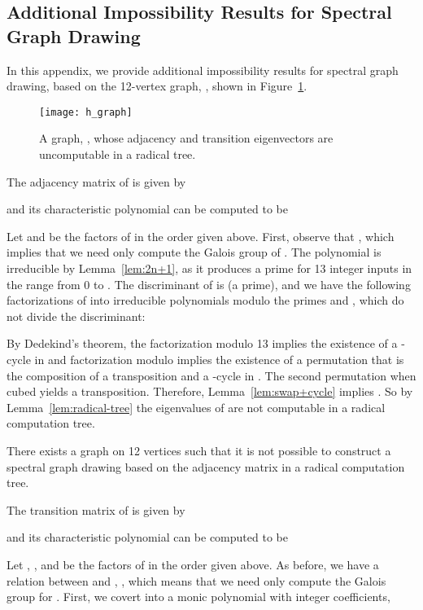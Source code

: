 \documentclass[oribibl,10pt]{llncs}
\begin{document}
\begin{appendix}
\clearpage
\section{Additional Impossibility Results for Spectral Graph Drawing}
\label{app:spectral}
In this appendix, we provide additional impossibility results for spectral
graph drawing, based on the 12-vertex graph, , shown in
Figure~\ref{fig:h-graph}.

\begin{figure}[hbt]
\centering
\texttt{[image: h\_graph]}
\caption{A graph, , whose adjacency and transition eigenvectors are uncomputable in a radical tree.}
\label{fig:h-graph}
\end{figure}

The adjacency matrix of  is given by

and its characteristic polynomial can be computed to be

Let  and  be the factors of  in the order given above. First, observe that , which implies that we need only compute the Galois group of . The polynomial  is irreducible by Lemma~\ref{lem:2n+1}, as it produces a prime for 13 integer inputs in the range from 0 to . The discriminant of  is  (a prime), and we have the following factorizations of  into irreducible polynomials modulo the primes  and , which do not divide the discriminant:

By Dedekind's theorem, the factorization modulo 13 implies the existence of a -cycle in  and factorization modulo  implies the existence of a permutation that is the composition of a transposition and a -cycle in . The second permutation when cubed yields a transposition. Therefore, Lemma~\ref{lem:swap+cycle} implies . So by Lemma~\ref{lem:radical-tree} the eigenvalues of  are not computable in a radical computation tree.

\begin{theorem}
There exists a graph on 12 vertices such that it is not possible to construct a spectral graph drawing based on the adjacency matrix in a radical computation tree.
\end{theorem}

The transition matrix of  is given by

and its characteristic polynomial can be computed to be

Let , ,  and  be the factors of  in the order given above.
As before, we have a relation between  and , , which means that we need only compute the Galois group for . First, we covert  into a monic polynomial with integer coefficients,


\end{appendix}
\end{document}
